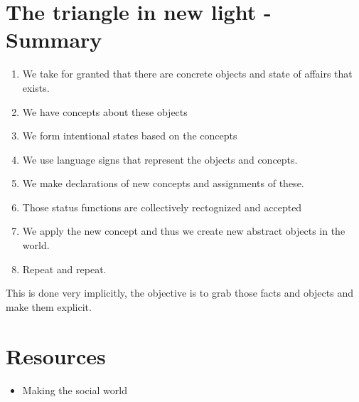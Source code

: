 \section{The triangle in new light - Summary}
\begin{enumerate}
    \item We take for granted that there are concrete objects and state of affairs that exists.
    \item We have concepts about these objects 
    \item We form intentional states based on the concepts 
    \item We use language signs that represent the objects and concepts.
    \item We make declarations of new concepts and assignments of these.
    \item Those status functions are collectively rectognized and accepted
    \item We apply the new concept and thus we create new abstract objects in the world.
    \item Repeat and repeat.
\end{enumerate}
This is done very implicitly, the objective is to grab those facts and objects and make them explicit.

\section{Resources}
\begin{itemize}
    \item Making the social world 
\end{itemize}
